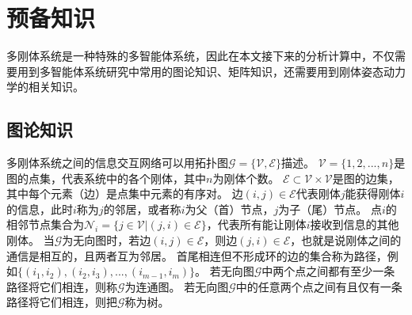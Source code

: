 
\chapter{预备知识}
多刚体系统是一种特殊的多智能体系统，因此在本文接下来的分析计算中，不仅需要用到多智能体系统研究中常用的图论知识、矩阵知识，还需要用到刚体姿态动力学的相关知识。
\section{图论知识}
多刚体系统之间的信息交互网络可以用拓扑图$\mathcal{G}=\{\mathcal{V},\mathcal{E}\}$描述\cite{ren2008distributed}。
$\mathcal{V}=\{1,2,...,n\}$是图的点集，代表系统中的各个刚体，其中$n$为刚体个数。
$\mathcal{E}\subset\mathcal{V}\times\mathcal{V}$是图的边集，其中每个元素（边）是点集中元素的有序对。
边$(i,j)\in\mathcal{E}$代表刚体$j$能获得刚体$i$的信息，此时$i$称为$j$的邻居，或者称$i$为父（首）节点，$j$为子（尾）节点。
点$i$的相邻节点集合为$\mathcal{N}_i=\{j\in\mathcal{V}|(j,i)\in\mathcal{E}\}$，代表所有能让刚体$i$接收到信息的其他刚体。
当$\mathcal{G}$为无向图时，若边$(i,j)\in\mathcal{E}$，则边$(j,i)\in\mathcal{E}$，也就是说刚体之间的通信是相互的，且两者互为邻居。
首尾相连但不形成环的边的集合称为路径，例如$\{(i_1,i_2),(i_2,i_3),...,(i_{m-1},i_m)\}$。
若无向图$\mathcal{G}$中两个点之间都有至少一条路径将它们相连，则称$\mathcal{G}$为连通图。
若无向图$\mathcal{G}$中的任意两个点之间有且仅有一条路径将它们相连，则把$\mathcal{G}$称为树。

